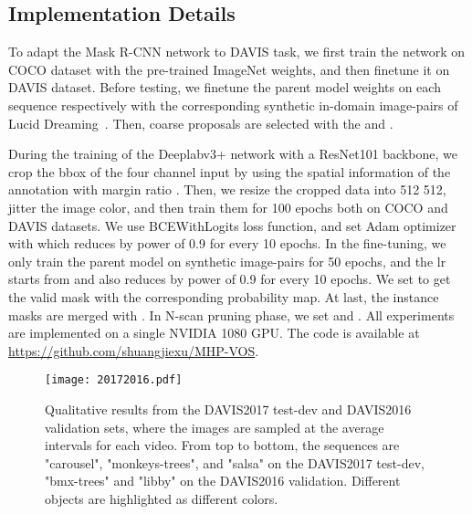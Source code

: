 \documentclass[10pt,twocolumn,letterpaper]{article}
\begin{document}
\subsection{Implementation Details}
\vspace{-5pt}

To adapt the Mask R-CNN \cite{he2017mask} network to DAVIS \cite{perazzi2016benchmark,Pont-Tuset_arXiv_2017,caelles20182018} task, we first train the network on COCO \cite{TsungYi2014Microsoft} dataset with the pre-trained ImageNet \cite{Deng2009ImageNet} weights, and then finetune it on DAVIS dataset. Before testing, we finetune the parent model weights on each sequence respectively with the corresponding  synthetic in-domain image-pairs of Lucid Dreaming~\cite{caelles2017one}. Then, coarse proposals are selected with the  and .



During the training of the Deeplabv3+ \cite{chen2018encoder} network with a ResNet101 \cite{He2015Deep} backbone, we crop the bbox of the four channel input by using the spatial information of the annotation with margin ratio . Then, we resize the cropped data into 512  512, jitter the image color, and then train them for 100 epochs both on COCO \cite{TsungYi2014Microsoft} and DAVIS \cite{perazzi2016benchmark,Pont-Tuset_arXiv_2017,caelles20182018} datasets. We use BCEWithLogits loss function, and set Adam \cite{Kingma2014Adam} optimizer with  which reduces by power of 0.9 for every 10 epochs. In the fine-tuning, we only train the parent model on synthetic image-pairs for 50 epochs, and the lr starts from  and also reduces by power of 0.9 for every 10 epochs. We set  to get the valid mask with the corresponding probability map. At last, the instance masks are merged with . In N-scan pruning phase, we set  and . All experiments are implemented on a single NVIDIA 1080 GPU. The code is available at  \href{https://github.com/shuangjiexu/MHP-VOS}{https://github.com/shuangjiexu/MHP-VOS}.

\begin{figure*}[t]
\vspace{-15pt}
\centering
\texttt{[image: 20172016.pdf]}
\vspace{-24pt}
\caption{Qualitative results from the DAVIS2017 test-dev and DAVIS2016 validation sets, where the images are sampled at the average intervals for each video. From top to bottom, the sequences are "carousel", "monkeys-trees", and "salsa" on the DAVIS2017 test-dev, "bmx-trees" and "libby" on the DAVIS2016 validation. Different objects are highlighted as different colors.}
\label{fig:test-dev}
\vspace{-10pt}
\end{figure*}
\end{document}

